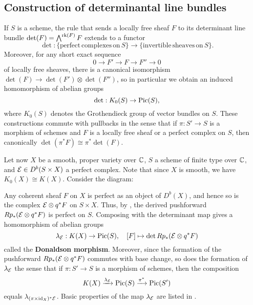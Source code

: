 \documentclass[letterpaper,11pt]{amsart}%
\theoremstyle{remark}
\begin{document}
\subsection{Construction of determinantal line bundles}
If $S$ is a scheme, the rule that sends a locally free sheaf $F$ to its determinant line bundle $\det(F) = \bigwedge^{\operatorname{\mathrm{rk}}(F)} F$ extends to a functor
\[ \det: \{\mathrm{perfect\, complexes\, on\,} S\} \to \{\mathrm{invertible\,} \mathrm{sheaves\, on}\, S \}. \]
Moreover, for any short exact sequence
\[ 0 \to F' \to F \to F'' \to 0 \]
of locally free sheaves, there is a canonical isomorphism $\det(F) \to \det(F') \otimes \det(F'')$, so in particular we obtain an induced homomorphism of abelian groups
\[ \det: K_0(S) \to \mathrm{Pic}(S), \]
where $K_0(S)$ denotes the Grothendieck group of vector bundles on $S$. These constructions commute with pullbacks in the sense that if $\pi: S' \to S$ is a morphism of schemes and $F$ is a locally free sheaf or a perfect complex on $S$, then canonically $\det(\pi^* F) \cong \pi^*\det(F)$.

Let now $X$ be a smooth, proper variety over $\mathbb{C}$, $S$ a scheme of finite type over $\mathbb{C}$, and $\mathcal{E} \in D^b(S \times X)$ a perfect complex. Note that since $X$ is smooth, we have $K_0(X) \cong K(X)$. Consider the diagram:
\begin{center}
\end{center}
Any coherent sheaf $F$ on $X$ is perfect as an object of $D^b(X)$, and hence so is the complex $\mathcal{E} \otimes q^*F$ on $S \times X$. Thus, by \cite[\href{https://stacks.math.columbia.edu/tag/0B91}{Tag 0B91}]{stacks-project}, the derived pushforward $R p_* (\mathcal{E} \otimes q^* F)$ is perfect on $S$. Composing with the determinant map gives a homomorphism of abelian groups
\[ \lambda_{\mathcal{E}}: K(X) \to \mathrm{Pic}(S), \quad [F] \mapsto \det R p_*(\mathcal{E} \otimes q^* F) \]
called the {\bf Donaldson morphism}. Moreover, since the formation of the pushforward $R p_*(\mathcal{E} \otimes q^* F)$ commutes with base change, so does the formation of $\lambda_{\mathcal{E}}$ the sense that if $\pi: S' \to S$ is a morphism of schemes, then the composition
\[ K(X) \xrightarrow{\lambda_{\mathcal{E}}} \mathrm{Pic}(S) \xrightarrow{\pi^*} \mathrm{Pic}(S') \]
equals $\lambda_{(\pi \times \mathrm{id}_X)^* \mathcal{E}}$. Basic properties of the map $\lambda_{\mathcal{E}}$ are listed in \cite[Lemma 8.1.2]{HL}.
\end{document}

